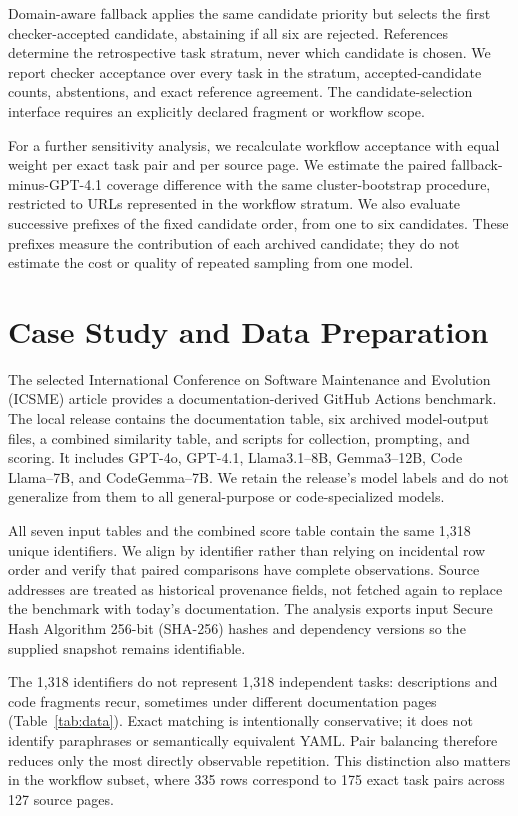Domain-aware fallback applies the same candidate priority but selects the first checker-accepted candidate, abstaining if all six are rejected. References determine the retrospective task stratum, never which candidate is chosen. We report checker acceptance over every task in the stratum, accepted-candidate counts, abstentions, and exact reference agreement. The candidate-selection interface requires an explicitly declared fragment or workflow scope.

For a further sensitivity analysis, we recalculate workflow acceptance with equal weight per exact task pair and per source page. We estimate the paired fallback-minus-GPT-4.1 coverage difference with the same cluster-bootstrap procedure, restricted to URLs represented in the workflow stratum. We also evaluate successive prefixes of the fixed candidate order, from one to six candidates. These prefixes measure the contribution of each archived candidate; they do not estimate the cost or quality of repeated sampling from one model.

\section{Case Study and Data Preparation}
The selected International Conference on Software Maintenance and Evolution (ICSME) article provides a documentation-derived GitHub Actions benchmark. The local release contains the documentation table, six archived model-output files, a combined similarity table, and scripts for collection, prompting, and scoring. It includes GPT-4o, GPT-4.1, Llama3.1--8B, Gemma3--12B, Code Llama--7B, and CodeGemma--7B. We retain the release's model labels and do not generalize from them to all general-purpose or code-specialized models.

All seven input tables and the combined score table contain the same 1,318 unique identifiers. We align by identifier rather than relying on incidental row order and verify that paired comparisons have complete observations. Source addresses are treated as historical provenance fields, not fetched again to replace the benchmark with today's documentation. The analysis exports input Secure Hash Algorithm 256-bit (SHA-256) hashes and dependency versions so the supplied snapshot remains identifiable.



The 1,318 identifiers do not represent 1,318 independent tasks: descriptions and code fragments recur, sometimes under different documentation pages (Table~\ref{tab:data}). Exact matching is intentionally conservative; it does not identify paraphrases or semantically equivalent YAML. Pair balancing therefore reduces only the most directly observable repetition. This distinction also matters in the workflow subset, where 335 rows correspond to 175 exact task pairs across 127 source pages.

